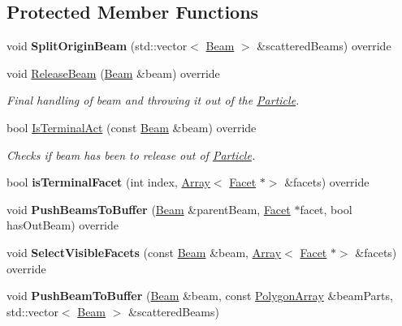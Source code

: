 \subsection*{Protected Member Functions}
\begin{DoxyCompactItemize}
\item 
\mbox{\label{class_scattering_non_convex_afcfbb0b23b87e3ee40ae0af796ddeb99}} 
void {\bfseries Split\+Origin\+Beam} (std\+::vector$<$ \mbox{\hyperlink{class_beam}{Beam}} $>$ \&scattered\+Beams) override
\item 
void \mbox{\hyperlink{class_scattering_non_convex_a574f2c4d503c6751f374e37e632f584a}{Release\+Beam}} (\mbox{\hyperlink{class_beam}{Beam}} \&beam) override
\begin{DoxyCompactList}\small\item\em Final handling of beam and throwing it out of the \mbox{\hyperlink{class_particle}{Particle}}. \end{DoxyCompactList}\item 
bool \mbox{\hyperlink{class_scattering_non_convex_aeda4103d997bc16e155fcc8281a51b05}{Is\+Terminal\+Act}} (const \mbox{\hyperlink{class_beam}{Beam}} \&beam) override
\begin{DoxyCompactList}\small\item\em Checks if beam has been to release out of \mbox{\hyperlink{class_particle}{Particle}}. \end{DoxyCompactList}\item 
\mbox{\label{class_scattering_non_convex_af4a5cf6ea90e373d223b1a0c1992e9b1}} 
bool {\bfseries is\+Terminal\+Facet} (int index, \mbox{\hyperlink{class_array}{Array}}$<$ \mbox{\hyperlink{class_facet}{Facet}} $\ast$$>$ \&facets) override
\item 
\mbox{\label{class_scattering_non_convex_a88c35057f13a659987a69974b56c9e96}} 
void {\bfseries Push\+Beams\+To\+Buffer} (\mbox{\hyperlink{class_beam}{Beam}} \&parent\+Beam, \mbox{\hyperlink{class_facet}{Facet}} $\ast$facet, bool has\+Out\+Beam) override
\item 
\mbox{\label{class_scattering_non_convex_ad3d5352614da4088536b1b07c2c46888}} 
void {\bfseries Select\+Visible\+Facets} (const \mbox{\hyperlink{class_beam}{Beam}} \&beam, \mbox{\hyperlink{class_array}{Array}}$<$ \mbox{\hyperlink{class_facet}{Facet}} $\ast$$>$ \&facets) override
\item 
\mbox{\label{class_scattering_non_convex_a1967c71c7e887a2837e5bf98e7d077c0}} 
void {\bfseries Push\+Beam\+To\+Buffer} (\mbox{\hyperlink{class_beam}{Beam}} \&beam, const \mbox{\hyperlink{class_polygon_array}{Polygon\+Array}} \&beam\+Parts, std\+::vector$<$ \mbox{\hyperlink{class_beam}{Beam}} $>$ \&scattered\+Beams)
\end{DoxyCompactItemize}
